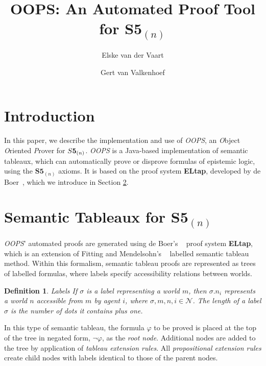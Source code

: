 \documentclass[11pt,a4paper]{article}
\author{Elske van der Vaart \and Gert van Valkenhoef}
\title{OOPS: An Automated Proof Tool for $\textbf{S5}_{(n)}$}
\newtheorem{defs}{Definition}[section]
\begin{document}
\maketitle

\section{Introduction}

In this paper, we describe the implementation and use of {\it OOPS}, an {\it O}bject {\it O}riented {\it P}rover for $\mathbf\mathit{S}\textbf{5}_{(n)}$. {\it OOPS} is a Java-based implementation of semantic tableaux, which can automatically prove or disprove  formulas of epistemic logic, using the $\textbf{S5}_{(n)}$ axioms. It is based on the proof system {\bf ELtap}, developed by de Boer~\cite{these}, which we introduce in Section \ref{theory}.

\section{Semantic Tableaux for $\textbf{S5}_{(n)}$}
\label{theory}
{\it OOPS}' automated proofs are generated using de Boer's ~\cite{these} proof system {\bf ELtap}, which is an extension of Fitting and Mendelsohn's ~\cite{fit_men} labelled semantic tableau method. Within this formalism, semantic tableau proofs are represented as trees of labelled formulas, where labels specify accessibility relations between worlds.

\begin{defs}{\it Labels} \newline
If $\sigma$ is a label representing a world $m$, then $\sigma.n_i$ represents a world $n$ accessible from $m$ by agent $i$, where $\sigma,m,n,i \in \mathcal{N}$. The {\it length} of a label $\sigma$ is the number of dots it contains plus one.~\cite{beck_gore} \end{defs} 

In this type of semantic tableau, the formula $\varphi$ to be proved is placed at the top of the tree in negated form, $\neg \varphi$, as the {\it root node}. Additional nodes are added to the tree by application of {\it tableau extension rules}. All {\it propositional extension rules} create child nodes with labels identical to those of the parent nodes.
\end{document}
